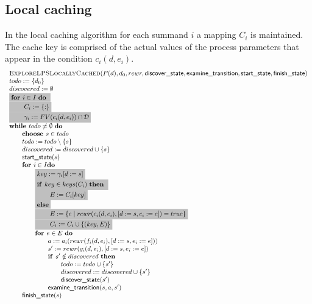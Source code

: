 \documentclass{article}
\newcommand{\emptymap}{\ensuremath{\{ : \}}}
\newcommand{\Space}{\text{\ }}
\newcommand{\If}{\text{\textbf{if }}}
\newcommand{\Do}{\text{\textbf{do }}}
\newcommand{\Then}{\text{\textbf{then }}}
\newcommand{\For}{\text{\textbf{for }}}
\newcommand{\While}{\text{\textbf{while }}}
\newcommand{\Choose}{\text{\textbf{choose }}}
\begin{document}
\subsection{Local caching}
In the local caching algorithm for each summand $i$ a mapping $C_i$ is maintained. The cache key is comprised of the actual values of the process parameters that appear in the condition $c_i(d, e_i)$.
\[
\begin{tabular}{l}
\textsc{ExploreLPSLocallyCached}($P(d), d_0, rewr, \textsf{discover\_state}, \textsf{examine\_transition},
\textsf{start\_state}, \textsf{finish\_state})$ \\
$todo := \{d_0\}$ \\
$discovered := \emptyset$ \\
\colorbox{lightgray}{\For $i \in I$ \Do} \\
\colorbox{lightgray}{\qquad $C_i := \emptymap$} \\
\colorbox{lightgray}{\qquad $\gamma_i := FV(c_i(d, e_i)) \cap \mathcal{D}$} \\
$\While todo \neq \emptyset \Space \Do$ \\
\qquad $\Choose s \in todo$ \\
\qquad $todo := todo \setminus \{s\}$ \\
\qquad $discovered := discovered \cup \{s\}$ \\
\qquad $\textsf{start\_state}(s)$ \\
\qquad $\For i \in I \Do$ \\
\qquad \qquad \colorbox{lightgray}{$key := \gamma_i[d:=s]$} \\
\qquad \qquad \colorbox{lightgray}{\If $key \in keys(C_i)$ \Then} \\
\qquad \qquad \colorbox{lightgray}{\qquad $E := C_i[key]$} \\
\qquad \qquad \colorbox{lightgray}{\textbf{else}} \\
\qquad \qquad \colorbox{lightgray}{\qquad $E := \{ e \mid rewr(c_i(d, e_i), [d:=s,e_i:=e]) = true \}$} \\
\qquad \qquad \colorbox{lightgray}{\qquad $C_i := C_i \cup \{(key, E)\}$} \\
\qquad \qquad $\For e \in E  \Space \Do$ \\
\qquad \qquad \qquad $a := a_i(rewr(f_i(d,e_i), [d:=s,e_i:=e]))$ \\
\qquad \qquad \qquad $s' := rewr(g_i(d,e_i), [d:=s,e_i:=e])$ \\
\qquad \qquad \qquad $\If s' \notin discovered \Space \Then$ \\
\qquad \qquad \qquad \qquad $todo := todo \cup \{ s' \}$ \\
\qquad \qquad \qquad \qquad $discovered := discovered \cup \{s'\}$ \\
\qquad \qquad \qquad \qquad $\textsf{discover\_state}(s')$ \\
\qquad \qquad \qquad $\textsf{examine\_transition}(s, a, s')$ \\
\qquad $\textsf{finish\_state}(s)$ \\
\end{tabular}
\]
\end{document}
